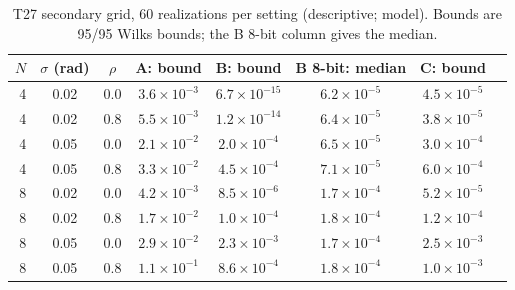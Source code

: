 \documentclass[11pt,a4paper]{article}
\begin{document}
\begin{table}[htbp]
\centering\small
\caption{T27 secondary grid, 60 realizations per setting (descriptive; model). Bounds are 95/95 Wilks bounds; the B 8-bit column gives the median.}
\label{tab:t27grid}
\begin{tabular}{@{}rccccccc@{}}
\toprule
$N$ & $\sigma$ (rad) & $\rho$ & A: bound & B: bound & B 8-bit: median & C: bound \\
\midrule
4 & 0.02 & 0.0 & $3.6\times10^{-3}$ & $6.7\times10^{-15}$ & $6.2\times10^{-5}$ & $4.5\times10^{-5}$ \\
4 & 0.02 & 0.8 & $5.5\times10^{-3}$ & $1.2\times10^{-14}$ & $6.4\times10^{-5}$ & $3.8\times10^{-5}$ \\
4 & 0.05 & 0.0 & $2.1\times10^{-2}$ & $2.0\times10^{-4}$ & $6.5\times10^{-5}$ & $3.0\times10^{-4}$ \\
4 & 0.05 & 0.8 & $3.3\times10^{-2}$ & $4.5\times10^{-4}$ & $7.1\times10^{-5}$ & $6.0\times10^{-4}$ \\
8 & 0.02 & 0.0 & $4.2\times10^{-3}$ & $8.5\times10^{-6}$ & $1.7\times10^{-4}$ & $5.2\times10^{-5}$ \\
8 & 0.02 & 0.8 & $1.7\times10^{-2}$ & $1.0\times10^{-4}$ & $1.8\times10^{-4}$ & $1.2\times10^{-4}$ \\
8 & 0.05 & 0.0 & $2.9\times10^{-2}$ & $2.3\times10^{-3}$ & $1.7\times10^{-4}$ & $2.5\times10^{-3}$ \\
8 & 0.05 & 0.8 & $1.1\times10^{-1}$ & $8.6\times10^{-4}$ & $1.8\times10^{-4}$ & $1.0\times10^{-3}$ \\
\bottomrule
\end{tabular}
\end{table}
\end{document}
